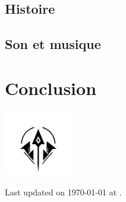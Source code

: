 \documentclass[12pt]{article}
\begin{document}
\subsection{Histoire}
% 

\subsection{Son et musique}
% 


\newpage
\section{Conclusion}
% 

\centering
\vspace*{1.8cm}
\includegraphics[width=3cm]{0.format/logo.png}

\vspace*{1cm}
Last updated on \today{} at \currenttime.
\end{document}
